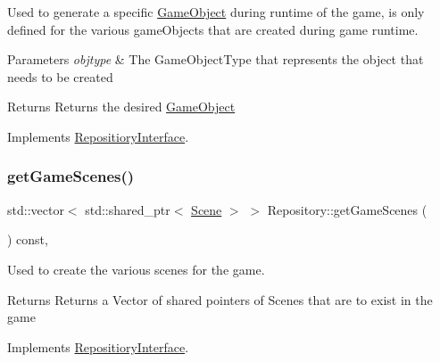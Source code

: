 Used to generate a specific \hyperlink{class_game_object}{Game\+Object} during runtime of the game, is only defined for the various game\+Objects that are created during game runtime. 


\begin{DoxyParams}{Parameters}
{\em objtype} & The Game\+Object\+Type that represents the object that needs to be created \\
\hline
\end{DoxyParams}
\begin{DoxyReturn}{Returns}
Returns the desired \hyperlink{class_game_object}{Game\+Object} 
\end{DoxyReturn}


Implements \hyperlink{class_repositiory_interface_a7341b8009f262949e26759327b0a8ae4}{Repositiory\+Interface}.

\mbox{\label{class_repository_ad49505f4ec3a15d0812ede7ff82b8be2}} 
\subsubsection{\texorpdfstring{get\+Game\+Scenes()}{getGameScenes()}}
{\footnotesize\ttfamily std\+::vector$<$ std\+::shared\+\_\+ptr$<$ \hyperlink{class_scene}{Scene} $>$ $>$ Repository\+::get\+Game\+Scenes (\begin{DoxyParamCaption}{ }\end{DoxyParamCaption}) const\hspace{0.3cm}{\ttfamily [override]}, {\ttfamily [virtual]}}



Used to create the various scenes for the game. 

\begin{DoxyReturn}{Returns}
Returns a Vector of shared pointers of Scenes that are to exist in the game 
\end{DoxyReturn}


Implements \hyperlink{class_repositiory_interface_a29a0f0fadd317082cb504bbb1161d50d}{Repositiory\+Interface}.

\mbox{\label{class_repository_ab369b3a1d2957b2bd3130c8c348343dd}} 
